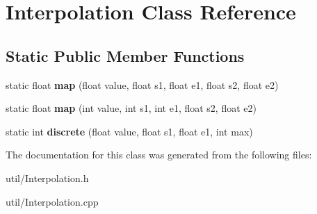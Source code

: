 \hypertarget{classInterpolation}{}\section{Interpolation Class Reference}
\label{classInterpolation}
\subsection*{Static Public Member Functions}
\begin{DoxyCompactItemize}
\item 
static float {\bfseries map} (float value, float s1, float e1, float s2, float e2)\hypertarget{classInterpolation_adfd3003c39c40ec76342274c65017761}{}\label{classInterpolation_adfd3003c39c40ec76342274c65017761}

\item 
static float {\bfseries map} (int value, int s1, int e1, float s2, float e2)\hypertarget{classInterpolation_ac6eab12deb9f79b79200aad3b219e7c3}{}\label{classInterpolation_ac6eab12deb9f79b79200aad3b219e7c3}

\item 
static int {\bfseries discrete} (float value, float s1, float e1, int max)\hypertarget{classInterpolation_a246c72a835822b7674758d657ed44230}{}\label{classInterpolation_a246c72a835822b7674758d657ed44230}

\end{DoxyCompactItemize}


The documentation for this class was generated from the following files\+:\begin{DoxyCompactItemize}
\item 
util/Interpolation.\+h\item 
util/Interpolation.\+cpp\end{DoxyCompactItemize}
